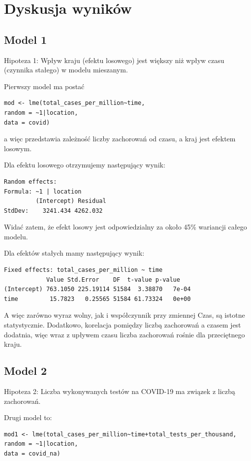 \documentclass[12pt]{mwbk}
\theoremstyle{plain}
\theoremstyle{definition}
\theoremstyle{remark}
\begin{document}
\section{Dyskusja wyników}

\subsection{Model 1}

Hipoteza 1: Wpływ kraju (efektu losowego) jest większy niż wpływ czasu (czynnika stałego) w modelu mieszanym.

Pierwszy model ma postać 
\begin{verbatim}
mod <- lme(total_cases_per_million~time, 
random = ~1|location, 
data = covid)
\end{verbatim}

a więc przedstawia zależność liczby zachorowań od czasu, a kraj jest efektem losowym.

Dla efektu losowego otrzymujemy następujący wynik:

\begin{verbatim}
Random effects:
Formula: ~1 | location
         (Intercept) Residual
StdDev:    3241.434 4262.032
\end{verbatim}

Widać zatem, że efekt losowy jest odpowiedzialny za około 45\% wariancji całego modelu.

Dla efektów stałych mamy następujący wynik:

\begin{verbatim}
Fixed effects: total_cases_per_million ~ time 
            Value Std.Error    DF  t-value p-value
(Intercept) 763.1050 225.19114 51584  3.38870   7e-04
time         15.7823   0.25565 51584 61.73324   0e+00
\end{verbatim}

A więc zarówno wyraz wolny, jak i współczynnik przy zmiennej Czas, są istotne statystycznie. Dodatkowo, korelacja pomiędzy liczbą zachorowań a czasem jest dodatnia, więc wraz z upływem czasu liczba zachorowań rośnie dla przeciętnego kraju.
\subsection{Model 2}

Hipoteza 2: Liczba wykonywanych testów na COVID-19 ma związek z liczbą zachorowań.

Drugi model to:
\begin{verbatim}
mod1 <- lme(total_cases_per_million~time+total_tests_per_thousand,
random = ~1|location,
data = covid_na)
\end{verbatim}
\end{document}
